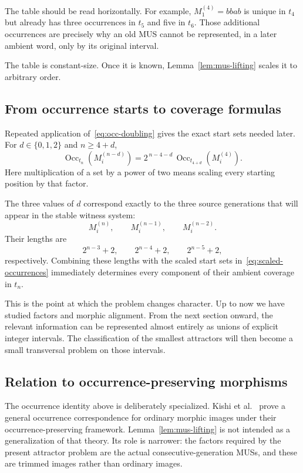 \documentclass[10pt,a4paper]{article}
\theoremstyle{definition}\newtheorem{definition}[theorem]{Definition}
\theoremstyle{remark}\newtheorem{remark}[theorem]{Remark}
\newcommand{\Occ}{\operatorname{Occ}}
\begin{document}
The table should be read horizontally. For example, $M_1^{(4)}=bbab$ is unique in $t_4$ but already has three occurrences in $t_5$ and five in $t_6$. Those additional occurrences are precisely why an old MUS cannot be represented, in a later ambient word, only by its original interval.

The table is constant-size. Once it is known, Lemma~\ref{lem:mus-lifting} scales it to arbitrary order.

\subsection{From occurrence starts to coverage formulas}
\label{subsec:from-starts-to-coverages}

Repeated application of~\eqref{eq:occ-doubling} gives the exact start sets needed later. For $d\in\{0,1,2\}$ and $n\ge4+d$,
\begin{equation}
\Occ_{t_n}\!\left(M_i^{(n-d)}\right)
=
2^{\,n-4-d}\,
\Occ_{t_{4+d}}\!\left(M_i^{(4)}\right).
\label{eq:scaled-occurrences}
\end{equation}
Here multiplication of a set by a power of two means scaling every starting position by that factor.

The three values of $d$ correspond exactly to the three source generations that will appear in the stable witness system:
\[
M_i^{(n)},\qquad M_i^{(n-1)},\qquad M_i^{(n-2)}.
\]
Their lengths are
\[
2^{n-3}+2,\qquad 2^{n-4}+2,\qquad 2^{n-5}+2,
\]
respectively. Combining these lengths with the scaled start sets in~\eqref{eq:scaled-occurrences} immediately determines every component of their ambient coverage in $t_n$.

This is the point at which the problem changes character. Up to now we have studied factors and morphic alignment. From the next section onward, the relevant information can be represented almost entirely as unions of explicit integer intervals. The classification of the smallest attractors will then become a small transversal problem on those intervals.

\subsection{Relation to occurrence-preserving morphisms}
\label{subsec:relation-opm}

The occurrence identity above is deliberately specialized. Kishi et al.~\cite{Kishi2026} prove a general occurrence correspondence for ordinary morphic images under their occurrence-preserving framework. Lemma~\ref{lem:mus-lifting} is not intended as a generalization of that theory. Its role is narrower: the factors required by the present attractor problem are the actual consecutive-generation MUSs, and these are trimmed images rather than ordinary images.
\end{document}

